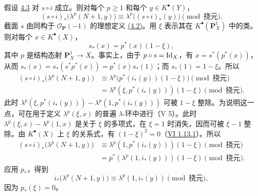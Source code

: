 假设 \hyperlink{sga6.e07.thm.4-3}{4.3} 对 \(s\circ i\) 成立。则对每个 \(p\ge1\) 和每个 \(y\in K^\bullet(Y)\)，
\begin{equation}\tag{4.3.3}
 (s\circ i)_*\bigl(\lambda^p(N+1,y)\bigr)
 \equiv
 \lambda^p\bigl((s\circ i)_*(y)\bigr)
  \pmod{\text{挠元}}.
\end{equation}
截面 \(s\) 由同构于 \(\mathcal O_{\mathbf P}(-1)\) 的理想定义 \hyperlink{sga6.e07.sec.4.2}{(4.2)}。用 \(\xi\) 表示其在 \(K^\bullet(\mathbf P_X^1)\) 中的类。则对每个 \(x\in K^\bullet(X)\)，
\[
  s_*(x)=p^*(x)(1-\xi),
\]
其中 \(p\) 是结构态射 \(\mathbf P_X^1\to X\)。事实上，由于 \(p\circ s=\operatorname{Id}_X\)，有 \(x=s^*(p^*(x))\)，从而 \(s_*(x)=s_*(s^*p^*(x))=p^*(x)s_*(1)\)；而 \(s_*(1)=1-\xi\)。所以
\[
\begin{aligned}
(s\circ i)_*\bigl(\lambda^p(N+1,y)\bigr)
&\equiv \lambda^p\bigl(p^*(i_*(y))(1-\xi)\bigr)\pmod{\text{挠元}}\\
&= \lambda^p(\xi,p^*(i_*(y)))(1-\xi)\pmod{\text{挠元}}.
\end{aligned}
\]
此时 \(\lambda^p(\xi,p^*(i_*(y)))-\lambda^p(1,p^*(i_*(y)))\) 可被 \(1-\xi\) 整除。为说明这一点，可在用于定义 \(\lambda^p(\xi,x)\) 的普遍 \(\lambda\)-环中进行（V 5）。此时 \(\lambda^p(\xi,x)-\lambda^p(1,x)\) 是关于 \(\xi\) 的多项式，在 \(\xi=1\) 时消失，因而可被 \(\xi-1\) 整除。由 \(K^\bullet(X)\) 上 \(\xi\) 的关系式，有 \((1-\xi)^2=0\)（\hyperlink{sga6.e06.eq.1-13-1}{VI 1.13.1}）。所以
\[
\begin{aligned}
(s\circ i)_*\bigl(\lambda^p(N+1,y)\bigr)
&\equiv \lambda^p(1,p^*(i_*(y)))(1-\xi) \pmod{\text{挠元}}\\
&=p^*(\lambda^p(1,i_*(y)))(1-\xi) \pmod{\text{挠元}}.
\end{aligned}
\]
应用 \(p_*\)，得到
\begin{equation}\tag{4.3.4}
  i_*\bigl(\lambda^p(N+1,y)\bigr)
   \equiv \lambda^p(1,i_*(y)) \pmod{\text{挠元}},
\end{equation}
因为 \(p_*(\xi)=0\)。

